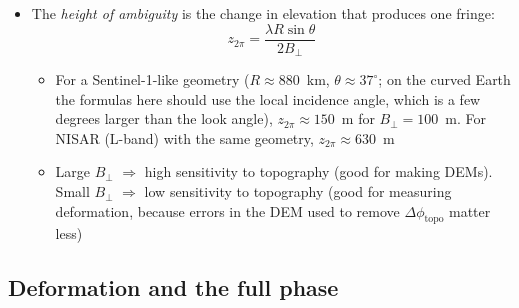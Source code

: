 \documentclass[11pt, oneside]{article}
\newcommand{\Bperp}{B_\perp}
\newcommand{\zamb}{z_{2\pi}}
\begin{document}
\begin{itemize}
	\item The \emph{height of ambiguity} is the change in elevation that produces one fringe:
	\begin{equation}
		\label{e:hamb}
		\boxed{\zamb = \frac{\lambda R\sin\theta}{2\Bperp}}
	\end{equation}
	\begin{itemize}
		\item For a Sentinel-1-like geometry ($R \approx 880$~km, $\theta \approx 37^\circ$; on the curved Earth the formulas here should use the local incidence angle, which is a few degrees larger than the look angle), $\zamb \approx 150$~m for $\Bperp = 100$~m. For NISAR (L-band) with the same geometry, $\zamb \approx 630$~m
		\item Large $\Bperp$ $\Rightarrow$ high sensitivity to topography (good for making DEMs). Small $\Bperp$ $\Rightarrow$ low sensitivity to topography (good for measuring deformation, because errors in the DEM used to remove $\Delta\phi_\mathrm{topo}$ matter less)
	\end{itemize}
\end{itemize}

\subsection{Deformation and the full phase}
\end{document}
